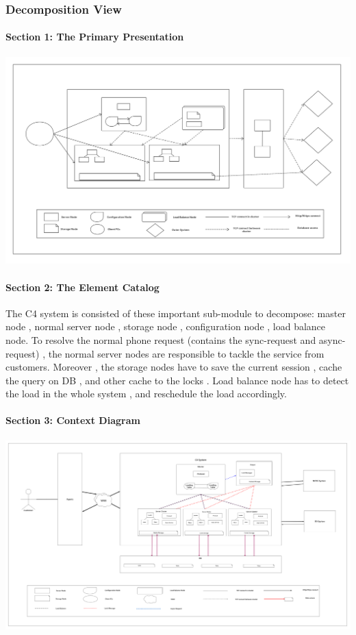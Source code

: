 \documentclass{article}
\begin{document}
		\subsubsection{Decomposition View} 
			\paragraph{Section 1: The Primary Presentation}
			\begin{center}
			\includegraphics[scale=0.15]{decom_section1.png}
			\end{center}
			\paragraph{Section 2: The Element Catalog}
			The C4 system is consisted of these important sub-module to decompose:  master node , normal server node , storage node , configuration node , load balance node. To resolve the normal phone request (contains the sync-request and async-request) , the normal server nodes are responsible to tackle the service from customers. Moreover , the storage nodes have to save the current session , cache the query on DB , and other cache to the locks . Load balance node has to detect the load in the whole system , and reschedule the load accordingly. 
			\paragraph{Section 3: Context Diagram}
			\begin{center}
			\includegraphics[scale=0.05]{decom_section2.png}
			\end{center}
\end{document}
